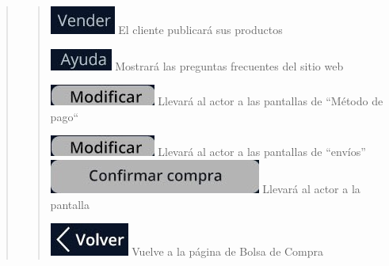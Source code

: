 \documentclass[14pt]{article}
\begin{document}
\begin{quote}
\begin{quote}
                            \includegraphics[height=0.02\textwidth]{BotonVender.jpg}
                            \label{P8:BotonVender} El cliente publicará sus productos
                            
                            \includegraphics[height=0.02\textwidth]{BotonAyuda.jpg}
                            \label{P8:BotonAyuda} Mostrará las preguntas frecuentes del sitio web
                            
                            \includegraphics[height=0.02\textwidth]{BotonModificar.jpg}
                            \label{P8:BotonModificarMetodoDePago} Llevará al actor a las pantallas de “Método de pago“
                            
                            \includegraphics[height=0.02\textwidth]{BotonModificar.jpg}
                            \label{P8:BotonModificarMetodoDeEnvios} Llevará al actor a las pantallas de “envíos”
                            \includegraphics[height=0.02\textwidth]{BotonConfirmarCompra.jpg}
                            \label{P8:BotonConfirmarCompra} Llevará al actor a la pantalla
                            
                            \includegraphics[height=0.02\textwidth]{BotonVolver.jpg}
                            \label{P8:BotonVolver} Vuelve a la página de Bolsa de Compra
                        \end{quote}
                \end{quote}
            
            \newpage
\end{document}
